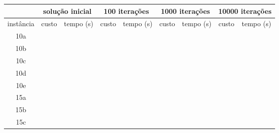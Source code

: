 \documentclass[12pt]{article}
\begin{document}
\begin{sidewaystable}[h]
\begin{tabular}{|c|c|c||c|c||c|c||c|c|}
\cline{2-9}
\multicolumn{1}{c}{} & \multicolumn{2}{|c||}{solu\c{c}\~ao inicial} & \multicolumn{2}{c||}{100 itera\c{c}\~oes} & \multicolumn{2}{c||}{1000 itera\c{c}\~oes} & \multicolumn{2}{c|}{10000 itera\c{c}\~oes} \\
\hline
inst\^ancia & custo & tempo (s) & custo & tempo (s) & custo & tempo (s) & custo & tempo (s) \\
\hline
10a & \hspace{1.7cm} & & \hspace{1.7cm} & & \hspace{1.7cm} & & \hspace{1.7cm} & \\
10b & \hspace{1.7cm} & & \hspace{1.7cm} & & \hspace{1.7cm} & & \hspace{1.7cm} & \\
10c & \hspace{1.7cm} & & \hspace{1.7cm} & & \hspace{1.7cm} & & \hspace{1.7cm} & \\
10d & \hspace{1.7cm} & & \hspace{1.7cm} & & \hspace{1.7cm} & & \hspace{1.7cm} & \\
10e & \hspace{1.7cm} & & \hspace{1.7cm} & & \hspace{1.7cm} & & \hspace{1.7cm} & \\
\hline
15a & \hspace{1.7cm} & & \hspace{1.7cm} & & \hspace{1.7cm} & & \hspace{1.7cm} & \\
15b & \hspace{1.7cm} & & \hspace{1.7cm} & & \hspace{1.7cm} & & \hspace{1.7cm} & \\
15c & \hspace{1.7cm} & & \hspace{1.7cm} & & \hspace{1.7cm} & & \hspace{1.7cm} & \\

\end{tabular}
\end{sidewaystable}
\end{document}
